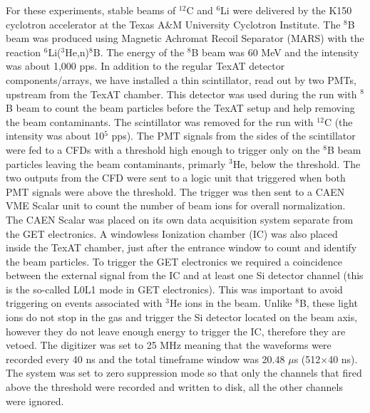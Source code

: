 \documentclass[final,number,sort&compress,5p,times,twocolumn]{elsarticle}
\begin{document}
For these experiments, stable beams of $^{12}$C and $^6$Li were delivered by the K150 cyclotron accelerator at the Texas A\&M University Cyclotron Institute. The $^8$B beam was produced using Magnetic Achromat Recoil Separator (MARS) \cite{MARS} with the reaction $^6$Li($^3$He,n)$^8$B. The energy of the $^8$B beam was 60 MeV and the intensity was about 1,000 pps.
In addition to the regular TexAT detector components/arrays, we have installed a thin scintillator, read out by two PMTs, upstream from the TexAT chamber. This detector was used during the run with $^8$B beam to count the beam particles before the TexAT setup and help removing the beam contaminants. The scintillator was removed for the run with $^{12}$C (the intensity was about 10$^5$ pps). The PMT signals from the sides of the scintillator were fed to a CFDs with a threshold high enough to trigger only on the $^{8}$B beam particles leaving the beam contaminants, primarly  $^3$He, below the threshold. The two outputs from the CFD were sent to a logic unit that triggered when both PMT signals were above the threshold. The trigger was then sent to a CAEN VME Scalar unit to count the number of beam ions for overall normalization. The CAEN Scalar was placed on its own data acquisition system separate from the GET electronics. A windowless Ionization chamber (IC) was also placed inside the TexAT chamber, just after the entrance window to count and identify the beam particles. To trigger the GET electronics we required a coincidence between the external signal from the IC and at least one Si detector channel (this is the so-called L0L1 mode in GET electronics). This was important to avoid triggering on events associated with $^3$He ions in the beam. Unlike $^8$B,  these light ions do not stop in the gas and trigger the Si detector located on the beam axis, however they do not leave enough energy to trigger the IC, therefore they are vetoed.  The digitizer was set to 25 MHz meaning that the waveforms were recorded every 40 ns and the total timeframe window was 20.48 $\mu$s (512$\times$40 ns). The system was set to zero suppression mode so that only the channels that fired above the threshold were recorded and written to disk, all the other channels were ignored.

\end{document}
